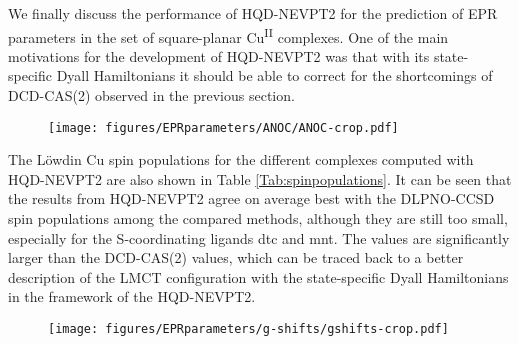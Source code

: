We finally discuss the performance of HQD-NEVPT2 for the prediction of EPR parameters in the set of square-planar Cu\textsuperscript{II} complexes. One of the main motivations for the development of HQD-NEVPT2 was that with its state-specific Dyall Hamiltonians it should be able to correct for the shortcomings of DCD-CAS(2) observed in the previous section.

\begin{figure}
\centering
{}
{\texttt{[image: figures/EPRparameters/ANOC/ANOC-crop.pdf]}}
\end{figure}

The Löwdin Cu spin populations for the different complexes computed with HQD-NEVPT2 are also shown in Table \ref{Tab:spinpopulations}. It can be seen that the results from HQD-NEVPT2 agree on average best with the DLPNO-CCSD spin populations among the compared methods, although they are still too small, especially for the S-coordinating ligands dtc and mnt. The values are significantly larger than the DCD-CAS(2) values, which can be traced back to a better description of the LMCT configuration with the state-specific Dyall Hamiltonians in the framework of the HQD-NEVPT2.

\begin{figure}
\centering
{}
{\texttt{[image: figures/EPRparameters/g-shifts/gshifts-crop.pdf]}}
\end{figure}

